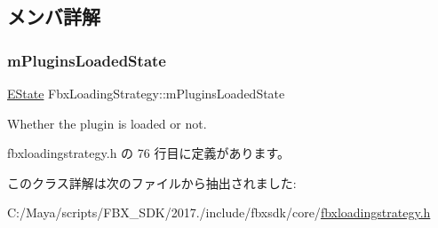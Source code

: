 \subsection{メンバ詳解}
\mbox{\label{class_fbx_loading_strategy_a7ae53371abecd1686cd765d19697e1c8}} 
\subsubsection{\texorpdfstring{m\+Plugins\+Loaded\+State}{mPluginsLoadedState}}
{\footnotesize\ttfamily \hyperlink{class_fbx_loading_strategy_a2f61523e78f4bb06d46ccf3351d2bcdb}{E\+State} Fbx\+Loading\+Strategy\+::m\+Plugins\+Loaded\+State\hspace{0.3cm}{\ttfamily [protected]}}



Whether the plugin is loaded or not. 



 fbxloadingstrategy.\+h の 76 行目に定義があります。



このクラス詳解は次のファイルから抽出されました\+:\begin{DoxyCompactItemize}
\item 
C\+:/\+Maya/scripts/\+F\+B\+X\+\_\+\+S\+D\+K/2017./include/fbxsdk/core/\hyperlink{fbxloadingstrategy_8h}{fbxloadingstrategy.\+h}\end{DoxyCompactItemize}

